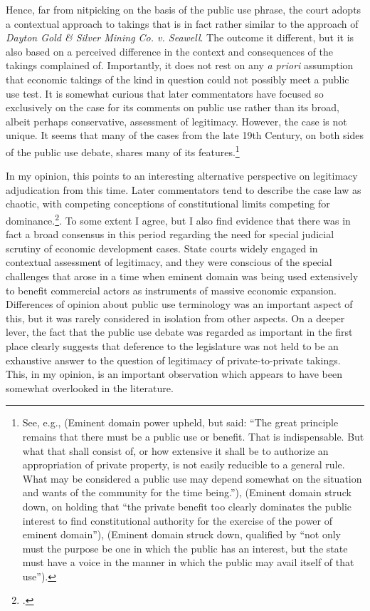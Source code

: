 Hence, far from nitpicking on the basis of the public use phrase, the court adopts a contextual approach to takings that is in fact rather similar to the approach of {\it Dayton Gold \& Silver Mining Co. v. Seawell}. The outcome it different, but it is also based on a perceived difference in the context and consequences of the takings complained of. Importantly, it does not rest on any {\it a priori} assumption that economic takings of the kind in question could not possibly meet a public use test. It is somewhat curious that later commentators have focused so exclusively on the case for its comments on public use rather than its broad, albeit perhaps conservative, assessment of legitimacy. However, the case is not unique. It seems that many of the cases from the late 19th Century, on both sides of the public use debate, shares many of its features.\footnote{See, e.g., \cite{scudder32} (Eminent domain power upheld, but said: ``The great principle remains that there must be a public use or benefit. That is indispensable. But what that shall consist of, or how extensive it shall be to authorize an appropriation of private property, is not easily reducible to a general rule. What may be considered a public use may depend somewhat on the situation and wants of the community for the time being.''), \cite{fallsburg03} (Eminent domain struck down, on holding that ``the private benefit too clearly dominates the public interest to find constitutional authority for the exercise of the power of eminent domain''), \cite[538]{board91} (Eminent domain struck down, qualified by ``not only must the purpose be one in which the public has an interest, but the state must have a voice in the manner in which the public may avail itself of that use'').}

In my opinion, this points to an interesting alternative perspective on legitimacy adjudication from this time. Later commentators tend to describe the case law as chaotic, with competing conceptions of constitutional limits competing for dominance.\footcite{nichols40,berger78,meidinger80}. To some extent I agree, but I also find evidence that there was in fact a broad consensus in this period regarding the need for special judicial scrutiny of economic development cases. State courts widely engaged in contextual assessment of legitimacy, and they were conscious of the special challenges that arose in a time when eminent domain was being used extensively to benefit commercial actors as instruments of massive economic expansion. Differences of opinion about public use terminology was an important aspect of this, but it was rarely considered in isolation from other aspects. On a deeper lever, the fact that the public use debate was regarded as important in the first place clearly suggests that deference to the legislature was not held to be an exhaustive answer to the question of legitimacy of private-to-private takings. This, in my opinion, is an important observation which appears to have been somewhat overlooked in the literature. 

